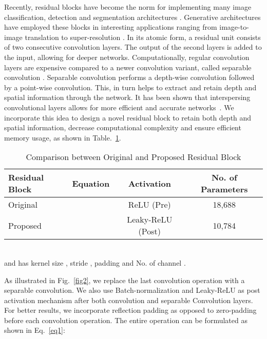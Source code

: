 \documentclass[a4paper,conference]{IEEEtran}
\begin{document}
Recently, residual blocks have become the norm for implementing many image classification, detection and segmentation architectures \cite{he2016deep,he2016identity}. Generative architectures have employed these blocks in interesting applications ranging from image-to-image translation to super-resolution \cite{johnson2016perceptual,wang2018high,ledig2017photo}. In its atomic form, a residual unit consists of two consecutive convolution layers. The output of the second layers is added to the input, allowing for deeper networks. Computationally, regular convolution layers are expensive compared to a newer convolution variant, called separable convolution \cite{chollet2017xception}. Separable convolution performs a depth-wise convolution followed by a point-wise convolution. This, in turn helps to extract and retain depth and spatial information through the network. It has been shown that interspersing convolutional layers allows for more efficient and accurate networks~\cite{opticnet19}. We incorporate this idea to design a novel residual block to retain both depth and spatial information, decrease computational complexity and ensure efficient memory usage, as shown in Table.~\ref{table1}.

\begin{table}[htb]
\caption{Comparison between Original and Proposed Residual Block}
    \label{table1}
\centering
\begin{tabular}{|l|c|c|c|} 
\hline
\small Residual Block & \small Equation & \small Activation & \small No. of Parameters\\
\hline\hline
\small Original
& \small  & \small ReLU (Pre) \cite{he2016identity}& \small 18,688 \\ 
\small Proposed  & \small  &  \small Leaky-ReLU (Post) & \small 10,784\\ 
\hline
\end{tabular}
\footnotesize
\\  and  has kernel size , stride , padding  and No. of channel .
\end{table}



As illustrated in Fig.~\ref{fig2}, we replace the last convolution operation with a separable convolution. We also use Batch-normalization \cite{ioffe2015batch} and Leaky-ReLU as post activation mechanism after both convolution and separable Convolution layers. For better results, we incorporate reflection padding as opposed to zero-padding before each convolution operation. The entire operation can be formulated as shown in Eq.~\ref{eq1}:
\end{document}
